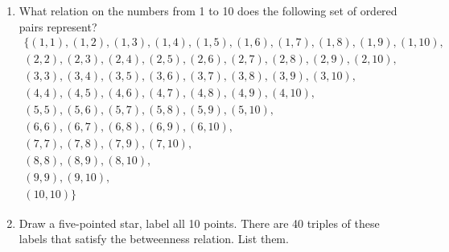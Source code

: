 \documentclass[10pt,]{book}
\theoremstyle{plain}
\theoremstyle{definition}
\theoremstyle{definition}
\numberwithin{equation}{section}
\newcommand{\hint}[1]{ }
\newcommand{\Rng}[1]{\mbox{Rng}(#1)}
\begin{document}
\begin{enumerate}[label=(\alph*)]
          \hint{
          \begin{equation*}
            f \; = \; \{(0,0), (1,1), (2,4), (3,2), (4,2), (5,4), (6,1)\}
          \end{equation*}
          \begin{equation*}
            \Rng{f} \;= \; \{0,1,2,4\}
          \end{equation*}
          }
\item\hypertarget{li-102}{}
          What relation on the numbers from 1 to 10 does the following set of ordered pairs
          represent?
          \begin{gather*}
\{ (1,1), (1,2), (1,3), (1,4), (1,5), (1,6), (1,7), (1,8), (1,9), (1,10),\\
(2,2), (2,3), (2,4), (2,5), (2,6), (2,7), (2,8), (2,9), (2,10),\\
(3,3), (3,4), (3,5), (3,6), (3,7), (3,8), (3,9), (3,10),\\
(4,4), (4,5), (4,6), (4,7), (4,8), (4,9), (4,10),\\
(5,5), (5,6), (5,7), (5,8), (5,9), (5,10),\\
(6,6), (6,7), (6,8), (6,9), (6,10),\\
(7,7), (7,8), (7,9), (7,10),\\
(8,8), (8,9), (8,10),\\
(9,9), (9,10),\\
(10,10) \}
\end{gather*}
          \hint{ Less-than-or-equal-to }
\item\hypertarget{li-103}{}
          Draw a five-pointed star, label all 10 points. There are 40 triples of these 
          labels that satisfy the betweenness relation.  List them.



          \hint{
          Yeah, hmmm. Forty is kind of a lot...
          Let's look at the points (E,F,G and B) on the horizontal line in the diagram below. The triples involving these four points are: (E,F,G), (G,F,E), (E,F,B), (B,F,E), (E,G,B), (B,G,E), (F,G,B), (B,G,F).



          \
          \texttt{[image: images/star.png]}

}
\end{enumerate}
\end{document}
